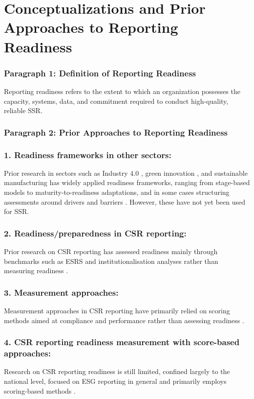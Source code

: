 \section{Conceptualizations and Prior Approaches to Reporting Readiness}

\subsubsection{Paragraph 1: Definition of Reporting Readiness}
Reporting readiness refers to the extent to which an organization possesses the capacity, systems, data,
and commitment required to conduct high-quality, reliable SSR.

\subsubsection{Paragraph 2: Prior Approaches to Reporting Readiness}

\subsubsection{1. Readiness frameworks in other sectors:}
Prior research in sectors such as Industry 4.0 \parencite{ElBaz2022}, 
green innovation \parencite{Zhang2020},
and sustainable manufacturing \parencite{Barletta2021} has widely applied readiness frameworks,
ranging from stage-based models to maturity-to-readiness adaptations, 
and in some cases structuring assessments around drivers and barriers \parencite{Govindan2023}.
However, these have not yet been used for SSR.

\subsubsection{2. Readiness/preparedness in CSR reporting:}
Prior research on CSR reporting has assessed readiness mainly through benchmarks 
such as ESRS and institutionalisation analyses rather than measuring readiness 
\parencite{Filho2025,Shabana2017}. 

\subsubsection{3. Measurement approaches:}
Measurement approaches in CSR reporting have primarily relied on scoring methods
aimed at compliance and performance rather than assessing readiness
\parencite{Tobias2022,Papoutsi2020,Gai2023,Nicolo2025}.

\subsubsection{4. CSR reporting readiness measurement with score-based approaches:}
Research on CSR reporting readiness is still limited, confined largely to the national level,
focused on ESG reporting in general  
and primarily employs scoring-based methods
\parencite{Nguyen2024,Montero2025}.

